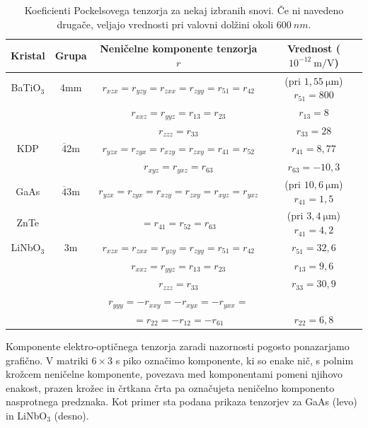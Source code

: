 \begin{table}[h!]
 \centering
\begin{tabular}{|c|c|c|c|} \hline  
      Kristal & Grupa & Neničelne komponente tenzorja $r$ & Vrednost ($10^{-12}~\si{\m/\V}$)\\ \hline
      BaTiO$_3$\index{BaTiO$_3$} & 4mm & $r_{xzx} = r_{yzy} = r_{zxx} = r_{zyy} = 
      r_{51} = r_{42}$  &
	    (pri $1,55~\si{\micro\metre}$) $r_{51} = 800$ \\
	      & & $r_{xxz} = r_{yyz} = r_{13} = r_{23}$ &  $r_{13} = 8$ \\
	      & & $r_{zzz} = r_{33}$ & $r_{33} = 28$ \\ \hline
      KDP\index{KDP} & 
      $\overline{4}$2m & $r_{yzx} = r_{zyx} = r_{xzy} = r_{zxy} = r_{41} = r_{52}$  &
	    $r_{41} = 8,77$ \\
	    & & $r_{xyz} = r_{yxz} = r_{63}$ &  $r_{63} = -10,3$ \\ \hline
      GaAs\index{GaAs}\index{ZnTe} &  $\overline{4}$3m&
	  $r_{yzx} = r_{zyx} = r_{xzy} = r_{zxy} = r_{xyz} = r_{yxz}$  & 
	  (pri $10,6~\si{\micro\metre}$) $r_{41} = 1,5$ \\
	ZnTe  & &   $= r_{41} = r_{52}=r_{63}$  &(pri $3,4~\si{\micro\metre}$) $r_{41} = 4,2$ 
	    \\ \hline
      LiNbO$_3$\index{LiNbO$_3$} & 3m & $r_{xzx} = r_{zxx} = r_{yzy} = r_{zyy} = r_{51} = r_{42}$  &
	    $r_{51} = 32,6$ \\
	     & & $r_{xxz} = r_{yyz} = r_{13} = r_{23}$ &  $r_{13} = 9,6$ \\
	      & & $r_{zzz} = r_{33}$ & $r_{33} = 30,9$ \\
	    & &  $r_{yyy} = - r_{xxy} = -r_{xyx} = -r_{yxx}  = $ & \\
	    & &  $=r_{22} =  -r_{12} =-r_{61} $  &
	    $r_{22}  = 6,8$ \\
\hline 
\end{tabular}
  \caption{Koeficienti Pockelsovega tenzorja za nekaj izbranih snovi. Če ni navedeno drugače, veljajo
  vrednosti pri valovni dolžini okoli $600~\si{nm}$.}
\label{table:Pockels}
\end{table}

\begin{remark}
Komponente elektro-optičnega tenzorja zaradi nazornosti pogosto ponazarjamo grafično. V matriki $6\times 3$
s piko označimo komponente, ki so enake nič, s polnim krožcem neničelne komponente, povezava med 
komponentami pomeni njihovo enakost, prazen krožec in črtkana črta pa označujeta 
neničelno komponento nasprotnega predznaka. Kot primer sta podana prikaza tenzorjev za 
GaAs (levo) in  LiNbO$_3$ (desno).
\begin{figure}[h!]
\centering
\def\svgwidth{20truemm} 
\qquad \qquad
\def\svgwidth{20truemm} 

\end{figure}
\end{remark}

